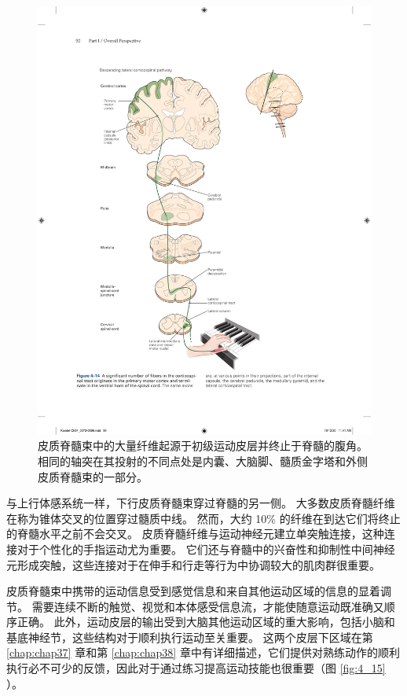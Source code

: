\begin{figure}[htbp]
	\centering
	\includegraphics[width=1.0\linewidth]{chap04/fig_4_14}
	\caption{皮质脊髓束中的大量纤维起源于初级运动皮层并终止于脊髓的腹角。
		相同的轴突在其投射的不同点处是内囊、大脑脚、髓质金字塔和外侧皮质脊髓束的一部分。}
	\label{fig:4_14}
\end{figure}


与上行体感系统一样，下行皮质脊髓束穿过脊髓的另一侧。 
大多数皮质脊髓纤维在称为锥体交叉的位置穿过髓质中线。 
然而，大约 10\% 的纤维在到达它们将终止的脊髓水平之前不会交叉。 
皮质脊髓纤维与运动神经元建立单突触连接，这种连接对于个性化的手指运动尤为重要。 
它们还与脊髓中的兴奋性和抑制性中间神经元形成突触，这些连接对于在伸手和行走等行为中协调较大的肌肉群很重要。


皮质脊髓束中携带的运动信息受到感觉信息和来自其他运动区域的信息的显着调节。 
需要连续不断的触觉、视觉和本体感受信息流，才能使随意运动既准确又顺序正确。 
此外，运动皮层的输出受到大脑其他运动区域的重大影响，包括小脑和基底神经节，这些结构对于顺利执行运动至关重要。 
这两个皮层下区域在第 \ref{chap:chap37} 章和第 \ref{chap:chap38} 章中有详细描述，它们提供对熟练动作的顺利执行必不可少的反馈，因此对于通过练习提高运动技能也很重要（图 \ref{fig:4_15} ）。

